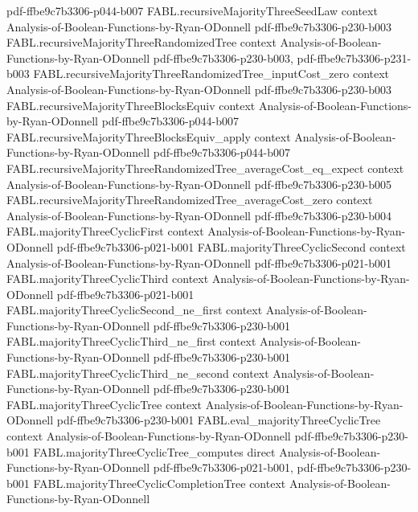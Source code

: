 \begin{theorem}
  {pdf-ffbe9c7b3306-p044-b007}
\proofstep
  {FABL.recursiveMajorityThreeSeedLaw}
  {context}
  {Analysis-of-Boolean-Functions-by-Ryan-ODonnell}
  {pdf-ffbe9c7b3306-p230-b003}
\proofstep
  {FABL.recursiveMajorityThreeRandomizedTree}
  {context}
  {Analysis-of-Boolean-Functions-by-Ryan-ODonnell}
  {pdf-ffbe9c7b3306-p230-b003,
    pdf-ffbe9c7b3306-p231-b003}
\proofstep
  {FABL.recursiveMajorityThreeRandomizedTree_inputCost_zero}
  {context}
  {Analysis-of-Boolean-Functions-by-Ryan-ODonnell}
  {pdf-ffbe9c7b3306-p230-b003}
\proofstep
  {FABL.recursiveMajorityThreeBlocksEquiv}
  {context}
  {Analysis-of-Boolean-Functions-by-Ryan-ODonnell}
  {pdf-ffbe9c7b3306-p044-b007}
\proofstep
  {FABL.recursiveMajorityThreeBlocksEquiv_apply}
  {context}
  {Analysis-of-Boolean-Functions-by-Ryan-ODonnell}
  {pdf-ffbe9c7b3306-p044-b007}
\proofstep
  {FABL.recursiveMajorityThreeRandomizedTree_averageCost_eq_expect}
  {context}
  {Analysis-of-Boolean-Functions-by-Ryan-ODonnell}
  {pdf-ffbe9c7b3306-p230-b005}
\proofstep
  {FABL.recursiveMajorityThreeRandomizedTree_averageCost_zero}
  {context}
  {Analysis-of-Boolean-Functions-by-Ryan-ODonnell}
  {pdf-ffbe9c7b3306-p230-b004}
\proofstep
  {FABL.majorityThreeCyclicFirst}
  {context}
  {Analysis-of-Boolean-Functions-by-Ryan-ODonnell}
  {pdf-ffbe9c7b3306-p021-b001}
\proofstep
  {FABL.majorityThreeCyclicSecond}
  {context}
  {Analysis-of-Boolean-Functions-by-Ryan-ODonnell}
  {pdf-ffbe9c7b3306-p021-b001}
\proofstep
  {FABL.majorityThreeCyclicThird}
  {context}
  {Analysis-of-Boolean-Functions-by-Ryan-ODonnell}
  {pdf-ffbe9c7b3306-p021-b001}
\proofstep
  {FABL.majorityThreeCyclicSecond_ne_first}
  {context}
  {Analysis-of-Boolean-Functions-by-Ryan-ODonnell}
  {pdf-ffbe9c7b3306-p230-b001}
\proofstep
  {FABL.majorityThreeCyclicThird_ne_first}
  {context}
  {Analysis-of-Boolean-Functions-by-Ryan-ODonnell}
  {pdf-ffbe9c7b3306-p230-b001}
\proofstep
  {FABL.majorityThreeCyclicThird_ne_second}
  {context}
  {Analysis-of-Boolean-Functions-by-Ryan-ODonnell}
  {pdf-ffbe9c7b3306-p230-b001}
\proofstep
  {FABL.majorityThreeCyclicTree}
  {context}
  {Analysis-of-Boolean-Functions-by-Ryan-ODonnell}
  {pdf-ffbe9c7b3306-p230-b001}
\proofstep
  {FABL.eval_majorityThreeCyclicTree}
  {context}
  {Analysis-of-Boolean-Functions-by-Ryan-ODonnell}
  {pdf-ffbe9c7b3306-p230-b001}
\proofstep
  {FABL.majorityThreeCyclicTree_computes}
  {direct}
  {Analysis-of-Boolean-Functions-by-Ryan-ODonnell}
  {pdf-ffbe9c7b3306-p021-b001,
    pdf-ffbe9c7b3306-p230-b001}
\proofstep
  {FABL.majorityThreeCyclicCompletionTree}
  {context}
  {Analysis-of-Boolean-Functions-by-Ryan-ODonnell}

\end{theorem}
